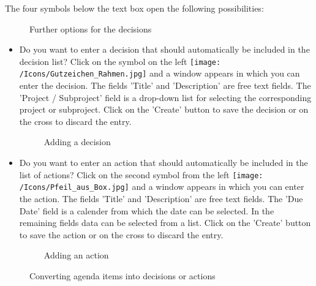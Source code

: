 The four symbols below the text box open the following possibilities:

\begin{figure}[H]
\caption{Further options for the decisions}
\end{figure}

\begin{itemize}
\item
Do you want to enter a decision that should automatically be included in the decision list? Click on the symbol on the left \texttt{[image: /Icons/Gutzeichen\_Rahmen.jpg]}  and a window appears in which you can enter the decision. The fields 'Title'  and 'Description'  are free text fields. The 'Project / Subproject' field  is a drop-down list for selecting the corresponding project or subproject. Click on the 'Create' button  to save the decision or on the cross  to discard the entry.

\begin{figure}[H]
\caption{Adding a decision}
\end{figure}

\end{itemize}

\begin{itemize}
\item
Do you want to enter an action that should automatically be included in the list of actions? Click on the second symbol from the left \texttt{[image: /Icons/Pfeil\_aus\_Box.jpg]}  and a window appears in which you can enter the action. The fields 'Title'  and 'Description'  are free text fields. The 'Due Date' field  is a calender from which the date can be selected. In the remaining fields  data can be selected from a list. Click on the 'Create' button  to save the action or on the cross  to discard the entry.

\begin{figure}[H]
\caption{Adding an action}
\end{figure}

\end{itemize}

\begin{figure}[H]
\caption{Converting agenda items into decisions or actions}
\end{figure}

